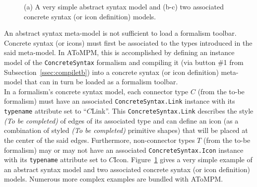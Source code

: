 \documentclass{article}
\numberwithin{equation}{section}
\numberwithin{figure}{section}
\newcommand{\TBC}{\textit{(To be completed) }}
\begin{document}
\begin{figure}
	\caption{(a) A very simple abstract syntax model and (b-c) two associated concrete syntax (or icon definition) models.}
	\label{fig:forestMM+CSMMs}
\end{figure}

An abstract syntax meta-model is not sufficient to load a formalism toolbar. Concrete syntax (or icons) must first be associated to the types introduced in the said meta-model. In AToMPM, this is accomplished by defining an instance model of the \texttt{ConcreteSyntax} formalism and compiling it (via button \#1 from Subsection~\ref{ssec:compiletb}) into a concrete syntax (or icon definition) meta-model that can in turn be loaded as a formalism toolbar.\\

In a formalism's concrete syntax model, each connector type $C$ (from the to-be formalism) must have an associated \texttt{ConcreteSyntax.Link} instance with its \texttt{typename} attribute set to ``$C$Link''. This \texttt{ConcreteSyntax.Link} describes the style \TBC of edges of its associated type and can define an icon (as a combination of styled \TBC primitive shapes) that will be placed at the center of the said edges. Furthermore, non-connector types $T$ (from the to-be formalism) may or may not have an associated \texttt{ConcreteSyntax.Icon} instance with its \texttt{typename} attribute set to $C$Icon. Figure~\ref{fig:forestMM+CSMMs} gives a very simple example of an abstract syntax model and two associated concrete syntax (or icon definition) models. Numerous more complex examples are bundled with AToMPM.\\
\end{document}

